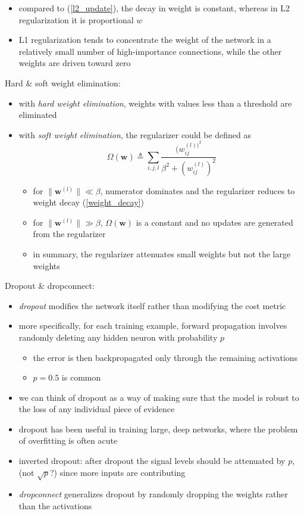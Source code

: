 \documentclass[onecolumn]{IEEEtran}
\newcommand{\beq}{\begin{equation}}
\newcommand{\eeq}{\end{equation}}
\newcommand{\bi}{\begin{itemize}}
\newcommand{\ei}{\end{itemize}}
\begin{document}
\begin{itemize}
        \item compared to (\ref{l2_update}), the decay in weight is constant, whereas in L2 regularization it is proportional $w$
        \item L1 regularization tends to concentrate the weight of the network in a relatively small number of high-importance connections, while the other weights are driven toward zero
    \ei
    \item Hard \& soft weight elimination:
    \bi
        \item with \emph{hard weight elimination}, weights with values less than a threshold are eliminated
        \item with \emph{soft weight elimination}, the regularizer could be defined as
        \beq
            \Omega(\bm{w}) \triangleq \sum_{i,j,l} \frac{(w_{ij}^{(l))^2}}{\beta^2 + (w_{ij}^{(l)})^2}
        \eeq
        \bi
            \item for $\|\bm{w}^{(l)}\| \ll \beta$, numerator dominates and the regularizer reduces to weight decay (\ref{weight_decay})
            \item for  $\|\bm{w}^{(l)}\| \gg \beta$, $\Omega(\bm{w})$ is a constant and no updates are generated from the regularizer
            \item in summary, the regularizer attenuates small weights but not the large weights
        \ei
    \ei
    \item Dropout \& dropconnect:
    \bi
        \item \emph{dropout} modifies the network itself rather than modifying the cost metric
        \item more specifically, for each training example, forward propagation involves randomly deleting any hidden neuron with probability $p$
        \bi
            \item the error is then backpropagated only through the remaining activations
            \item $p= 0.5$ is common
        \ei
        \item we can think of dropout as a way of making sure that the model is robust to the loss of any individual piece of evidence
        \item dropout has been useful in training large, deep networks, where the problem of overfitting is often acute
        \item inverted dropout: after dropout the signal levels should be attenuated by $p$, (not $\sqrt{p}$?) since more inputs are contributing
        \item \emph{dropconnect} generalizes dropout by randomly dropping the weights rather than the activations

\end{itemize}
\end{document}
